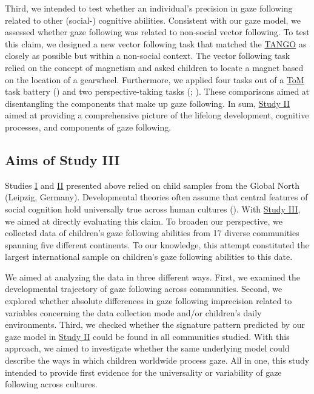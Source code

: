 \documentclass[
]{scrbook}
\begin{document}
Third, we intended to test whether an individual's precision in gaze following related to other (social-) cognitive abilities. Consistent with our gaze model, we assessed whether gaze following was related to non-social vector following. To test this claim, we designed a new vector following task that matched the \hyperref[acronyms_TANGO]{TANGO} as closely as possible but within a non-social context. The vector following task relied on the concept of magnetism and asked children to locate a magnet based on the location of a gearwheel. Furthermore, we applied four tasks out of a \hyperref[acronyms_ToM]{ToM} task battery () and two perspective-taking tasks (; ). These comparisons aimed at disentangling the components that make up gaze following. In sum, \hyperref[studyII]{Study II} aimed at providing a comprehensive picture of the lifelong development, cognitive processes, and components of gaze following.

\subsection{Aims of Study III}\label{aimsIII}

Studies \hyperref[studyI]{I} and \hyperref[studyII]{II} presented above relied on child samples from the Global North (Leipzig, Germany). Developmental theories often assume that central features of social cognition hold universally true across human cultures (). With \hyperref[studyIII]{Study III}, we aimed at directly evaluating this claim. To broaden our perspective, we collected data of children's gaze following abilities from 17 diverse communities spanning five different continents. To our knowledge, this attempt constituted the largest international sample on children's gaze following abilities to this date.

We aimed at analyzing the data in three different ways. First, we examined the developmental trajectory of gaze following across communities. Second, we explored whether absolute differences in gaze following imprecision related to variables concerning the data collection mode and/or children's daily environments. Third, we checked whether the signature pattern predicted by our gaze model in \hyperref[studyII]{Study II} could be found in all communities studied. With this approach, we aimed to investigate whether the same underlying model could describe the ways in which children worldwide process gaze. All in one, this study intended to provide first evidence for the universality or variability of gaze following across cultures.
\end{document}
